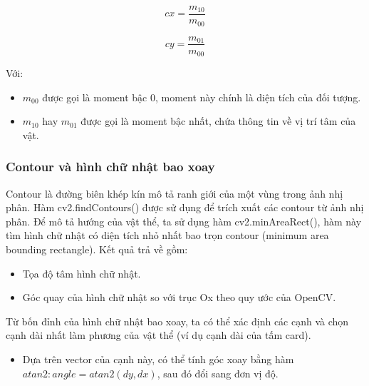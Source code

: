             \begin{equation}
                cx = \frac{m_{10}}{m_{00}}
            \end{equation}

            \begin{equation}
                cy = \frac{m_{01}}{m_{00}}
            \end{equation}

            Với:
            \begin{itemize}

                \item $m_{00}$ được gọi là moment bậc 0, moment này chính là diện tích của đối tượng.

                \item $m_{10}$ hay $m_{01}$ được gọi là moment bậc nhất, chứa thông tin về vị trí tâm của vật.
            \end{itemize}
        \subsubsection{Contour và hình chữ nhật bao xoay}

            \hspace*{0.6cm}Contour là đường biên khép kín mô tả ranh giới của một vùng trong ảnh nhị phân. Hàm cv2.findContours() được sử dụng để trích xuất các contour từ ảnh nhị phân. Để mô tả hướng của vật thể, ta sử dụng hàm cv2.minAreaRect(), hàm này tìm hình chữ nhật có diện tích nhỏ nhất bao trọn contour (minimum area bounding rectangle). Kết quả trả về gồm:

            \begin{itemize}
                \item Tọa độ tâm hình chữ nhật.
                \item Góc quay của hình chữ nhật so với trục Ox theo quy ước của OpenCV.
            \end{itemize}

            Từ bốn đỉnh của hình chữ nhật bao xoay, ta có thể xác định các cạnh và chọn cạnh dài nhất làm phương của vật thể (ví dụ cạnh dài của tấm card).

            \begin{itemize}
                \item Dựa trên vector của cạnh này, có thể tính góc xoay bằng hàm $atan2: angle = atan2(dy, dx)$, sau đó đổi sang đơn vị độ.
            \end{itemize}

